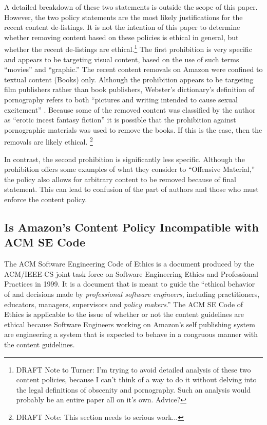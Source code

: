 \documentclass[11pt]{article}
\begin{document}
\begin{multicols}{2}
\begin{itemize}
\end{itemize}

A detailed breakdown of these two statements is outside the scope of this paper.  However, the two policy statements are the most likely justifications for the recent content de-listings.  It is not the intention of this paper to determine whether removing content based on these policies is ethical in general, but whether the recent de-listings are ethical.\footnote{DRAFT Note to Turner: I'm trying to avoid detailed analysis of these two content policies, because I can't think of a way to do it without delving into the legal definitions of obscenity and pornography.  Such an analysis would probably be an entire paper all on it's own. Advice?} The first prohibition is very specific and appears to be targeting visual content, based on the use of such terms ``movies'' and ``graphic.''  The recent content removals on Amazon were confined to textual content (Books) only.  Although the prohibition appears to be targeting film publishers rather than book publishers, Webster's dictionary's definition of pornography refers to both ``pictures and writing intended to cause sexual excitement'' \cite{WebsterOnlineDict}.  Because some of the removed content was classified by the author as ``erotic incest fantasy fiction'' \cite{KittSelfPubRevolution} it is possible that the prohibition against pornographic materials was used to remove the books.  If this is the case, then the removals are likely ethical.  \footnote{DRAFT Note: This section needs to serious work...}

In contrast, the second prohibition is significantly less specific. Although the prohibition offers some examples of what they consider to ``Offensive Material,'' the policy also allows for arbitrary content to be removed because of final statement. This can lead to confusion of the part of authors and those who must enforce the content policy.  


\subsection{Is Amazon's Content Policy Incompatible with ACM SE Code}

The ACM Software Engineering Code of Ethics is a document produced by the ACM/IEEE-CS joint task force on Software Engineering Ethics and Professional Practices in 1999.  It is a document that is meant to guide the ``ethical behavior of and decisions made by \emph{professional software engineers}, including practitioners, educators, managers, supervisors and \emph{policy makers}.'' \cite[Emphasis Mine]{SECode} The ACM SE Code of Ethics is applicable to the issue of whether or not the content guidelines are ethical because Software Engineers working on Amazon's self publishing system are engineering a system that is expected to behave in a congruous manner with the content guidelines.


\end{multicols}
\end{document}

